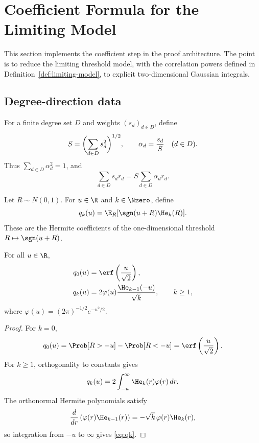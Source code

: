 \section{Coefficient Formula for the Limiting Model}
\label{sec:coefficients}

This section implements the coefficient step in the proof architecture.  The point is to reduce the limiting threshold model, with the correlation powers defined in Definition~\ref{def:limiting-model}, to explicit two-dimensional Gaussian integrals.

\subsection{Degree-direction data}\label{subsec:degree-data}

\begin{definition}\label{def:degree-normalization}
For a finite degree set $D$ and weights $(s_d)_{d\in D}$, define
\[
  S=\biggl(\sum_{d\in D}s_d^2\biggr)^{1/2},
  \qquad
  \alpha_d={s_d\over S}\quad(d\in D).
\]
Thus $\sum_{d\in D}\alpha_d^2=1$, and
\[
  \sum_{d\in D}s_dr_d=S\sum_{d\in D}\alpha_dr_d.
\]
\end{definition}

\begin{definition}\label{def:qk}
Let $R\sim N(0,1)$.  For $u\in\R$ and $k\in\Nzero$, define
\[
  q_k(u)=\E_R[\sgn(u+R)\He_k(R)].
\]
These are the Hermite coefficients of the one-dimensional threshold $R\mapsto \sgn(u+R)$.
\end{definition}

\begin{lemma}\label{lem:qk}
For all $u\in\R$,
\begin{align}
  q_0(u)&=\erf\left({u\over\sqrt2}\right),\label{eq:q0}\\
  q_k(u)&=2\varphi(u){\He_{k-1}(-u)\over\sqrt{k}},\qquad k\ge1,\label{eq:qk}
\end{align}
where $\varphi(u)=(2\pi)^{-1/2}e^{-u^2/2}$.
\end{lemma}

\begin{proof}
For $k=0$,
\[
  q_0(u)=\Prob[R>-u]-\Prob[R<-u]=\erf\left({u\over\sqrt2}\right).
\]
For $k\ge1$, orthogonality to constants gives
\[
  q_k(u)=2\int_{-u}^{\infty}\He_k(r)\varphi(r)\,dr.
\]
The orthonormal Hermite polynomials satisfy
\[
  {d\over dr}\left(\varphi(r)\He_{k-1}(r)\right)
  =-\sqrt{k}\,\varphi(r)\He_k(r),
\]
so integration from $-u$ to $\infty$ gives \eqref{eq:qk}.
\end{proof}

